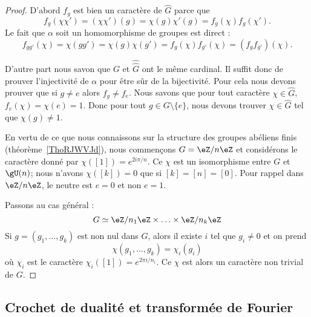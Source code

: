 \begin{proof}

    D'abord \( f_g\) est bien un caractère de \( \hat G\) parce que
    \begin{equation}
        f_g(\chi\chi')=(\chi\chi')(g)=\chi(g)\chi'(g)=f_g(\chi)f_g(\chi').
    \end{equation}
    Le fait que \( \alpha\) soit un homomorphisme de groupes est direct :
    \begin{equation}
        f_{gg'}(\chi)=\chi(gg')=\chi(g)\chi(g')=f_g(\chi)f_{g'}(\chi)=(f_gf_{g'})(\chi).
    \end{equation}

    D'autre part nous savon que \( G\) et \( \hat{\hat G}\) ont le même cardinal. Il suffit donc de prouver l'injectivité de \( \alpha\) pour être sûr de la bijectivité. Pour cela nous devons prouver que si \( g\neq e\) alors \( f_g\neq f_e\). Nous savons que pour tout caractère \( \chi\in \hat G\), \( f_e(\chi)=\chi(e)=1\). Donc pour tout \( g\in G\setminus\{ e \}\), nous devons trouver \( \chi\in \hat G\) tel que \( \chi(g)\neq 1\).

    En vertu de ce que nous connaissons sur la structure des groupes abéliens finis (théorème~\ref{ThoRJWVJd}), nous commençons \( G=\eZ/n\eZ\) et considérons le caractère donné par \( \chi([1])= e^{2i\pi/n}\). Ce \( \chi\) est un isomorphisme entre \( G\) et \( \gU(n)\); nous n'avons \( \chi([k])=0\) que si \( [k]=[n]=[0]\). Pour rappel dans \( \eZ/n\eZ\), le neutre est \( e=0\) et non \( e=1\).

    Passons au cas général :
    \begin{equation}
        G\simeq \eZ/n_1\eZ\times \ldots\times \eZ/n_k\eZ
    \end{equation}
    Si \( g=(g_1,\ldots, g_k)\) est non nul dans \( G\), alors il existe \( i\) tel que \( g_i\neq 0\) et on prend
    \begin{equation}
        \chi(g_1,\ldots, g_k)=\chi_i(g_i)
    \end{equation}
    où \( \chi_i\) est le caractère \( \chi_i([1])= e^{2\pi i/n_i}\). Ce \( \chi\) est alors un caractère non trivial de \( G\).

\end{proof}

\subsection{Crochet de dualité et transformée de Fourier}

